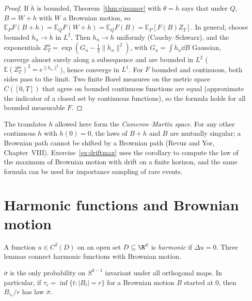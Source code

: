 \begin{proof}
If $\dot h$ is bounded, Theorem~\ref{thm:girsanov} with $\theta=\dot h$ says that under $Q$, $B=W+h$ with $W$ a Brownian motion, so $\mathbb E_PF(B+h)=\mathbb E_QF(W+h)=\mathbb E_QF(B)=\mathbb E_P[F(B)Z_T]$. In general, choose bounded $\dot h_n\to\dot h$ in $L^2$.
Then $h_n\to h$ uniformly (Cauchy--Schwarz), and the exponentials $Z^n_T=\exp(G_n-\frac12\|\dot h_n\|^2)$, with $G_n=\int\dot h_n\dd B$ Gaussian, converge almost surely along a subsequence and are bounded in $L^2$
($\mathbb E(Z^n_T)^2=e^{\|\dot h_n\|^2}$), hence converge in $L^1$. For $F$ bounded and continuous, both sides pass to the limit. Two finite Borel measures on the metric space $C([0,T])$ that agree on bounded continuous functions are
equal (approximate the indicator of a closed set by continuous functions), so the formula holds for all bounded measurable $F$.
\end{proof}

The translates $h$ allowed here form the \emph{Cameron--Martin space}. For any other continuous $h$ with $h(0)=0$, the laws of $B+h$ and $B$ are mutually singular; a Brownian path cannot be shifted by a
Brownian path (Revuz and Yor, Chapter~VIII). Exercise~\ref{ex:driftmax} uses the corollary to compute the law of the maximum of Brownian motion with drift on a finite horizon, and the same formula can be used for
importance sampling of rare events.

\section{Harmonic functions and Brownian motion}

A function $u\in C^2(D)$ on an open set $D\subseteq\R^d$ is \emph{harmonic} if $\Delta u=0$. Three lemmas connect harmonic functions with Brownian motion.

\begin{lemma}\label{lem:uniformsphere}
$\bar\sigma$ is the only probability on $S^{d-1}$ invariant under all orthogonal maps. In particular, if $\tau_r=\inf\{t:|B_t|=r\}$ for a Brownian motion $B$ started at $0$, then $B_{\tau_r}/r$ has law $\bar\sigma$.
\end{lemma}

